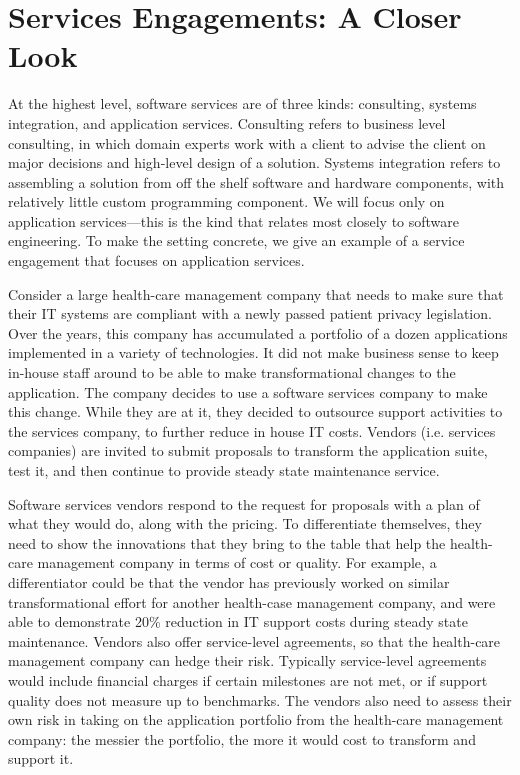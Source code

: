 \section{Services Engagements: A Closer Look}

At the highest level, software services are of three kinds: consulting, systems integration, and application services. Consulting refers to business level consulting, in which domain experts work with a client to advise the client on major decisions and high-level design of a solution.  Systems integration refers to assembling a solution from off the shelf software and hardware components, with relatively little custom programming component.  We will focus only on application services---this is the kind that relates most closely to software engineering.  To make the setting concrete, we give an example of a service engagement that focuses on application services. 

Consider a large health-care management company that needs to make sure that their IT systems are compliant with a newly passed patient privacy legislation. Over the years, this company has accumulated a portfolio of a dozen applications implemented in a variety of technologies. It did not make business sense to keep in-house staff around to be able to make transformational changes to the application. The company decides to use a software services company to make this change. While they are at it, they decided to outsource support activities to the services company, to further reduce in house IT costs.  Vendors (i.e. services companies) are invited to submit proposals to transform the application suite, test it, and then continue to provide steady state maintenance service.

Software services vendors respond to the request for proposals with a plan of what they would do, along with the pricing. To differentiate themselves, they need to show the innovations that they bring to the table that help the health-care management company in terms of cost or quality. For example, a differentiator could be that the vendor has previously worked on similar transformational effort for another health-case management company, and were able to demonstrate 20\% reduction in IT support costs during steady state maintenance. Vendors also offer service-level agreements, so that the health-care management company can hedge their risk.  Typically service-level agreements would include financial charges if certain milestones are not met, or if support quality does not measure up to benchmarks. The vendors also need to assess their own risk in taking on the application portfolio from the health-care management company: the messier the portfolio, the more it would cost to transform and support it.


